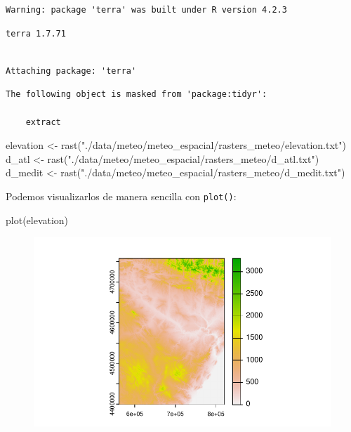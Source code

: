 \documentclass[
  letterpaper,
  DIV=11,
  numbers=noendperiod]{scrreprt}
\newenvironment{Shaded}{\begin{snugshade}}{\end{snugshade}}
\newcommand{\FunctionTok}[1]{\textcolor[rgb]{0.28,0.35,0.67}{#1}}
\newcommand{\NormalTok}[1]{\textcolor[rgb]{0.00,0.23,0.31}{#1}}
\newcommand{\OtherTok}[1]{\textcolor[rgb]{0.00,0.23,0.31}{#1}}
\newcommand{\StringTok}[1]{\textcolor[rgb]{0.13,0.47,0.30}{#1}}
\begin{document}
\begin{verbatim}
Warning: package 'terra' was built under R version 4.2.3
\end{verbatim}

\begin{verbatim}
terra 1.7.71
\end{verbatim}

\begin{verbatim}

Attaching package: 'terra'
\end{verbatim}

\begin{verbatim}
The following object is masked from 'package:tidyr':

    extract
\end{verbatim}

\begin{Shaded}
\begin{Highlighting}[]
\NormalTok{elevation }\OtherTok{\textless{}{-}} \FunctionTok{rast}\NormalTok{(}\StringTok{"./data/meteo/meteo\_espacial/rasters\_meteo/elevation.txt"}\NormalTok{)}
\NormalTok{d\_atl }\OtherTok{\textless{}{-}} \FunctionTok{rast}\NormalTok{(}\StringTok{"./data/meteo/meteo\_espacial/rasters\_meteo/d\_atl.txt"}\NormalTok{)}
\NormalTok{d\_medit }\OtherTok{\textless{}{-}} \FunctionTok{rast}\NormalTok{(}\StringTok{"./data/meteo/meteo\_espacial/rasters\_meteo/d\_medit.txt"}\NormalTok{)}
\end{Highlighting}
\end{Shaded}

Podemos visualizarlos de manera sencilla con \texttt{plot()}:

\begin{Shaded}
\begin{Highlighting}[]
\FunctionTok{plot}\NormalTok{(elevation)}
\end{Highlighting}
\end{Shaded}

\begin{figure}[H]

{\centering \includegraphics{01_RegresionLineal_files/figure-pdf/unnamed-chunk-38-1.pdf}

}

\end{figure}
\end{document}
